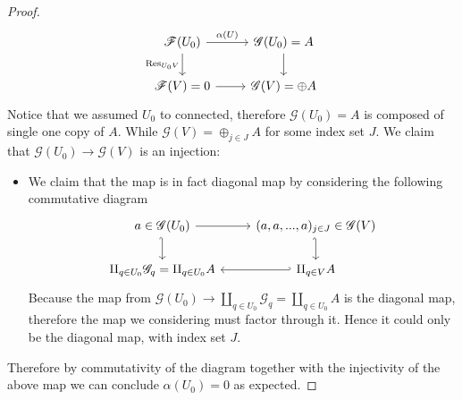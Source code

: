 \begin{proof}
\[\begin{tikzcd}
	{\mathscr F(U_0)} & {\mathscr G(U_0)=A} \\
	{\mathscr F(V)=0} & {\mathscr G(V)=\oplus A}
	\arrow["{\alpha(U)}", from=1-1, to=1-2]
	\arrow["{\operatorname{Res}_{U_0V}}"', from=1-1, to=2-1]
	\arrow[from=2-1, to=2-2]
	\arrow[from=1-2, to=2-2]
\end{tikzcd}\]
Notice that we assumed $U_0$ to connected, therefore $\mathscr G(U_0)=A$ is composed of single one copy of $A$. While $\mathscr G(V)=\oplus_{j\in J} A$ for some index set $J$.
We claim that $\mathscr G(U_0)\to \mathscr G(V)$ is an injection: 
\begin{itemize}
	\item We claim that the map is in fact diagonal map by considering the following commutative diagram 
\[\begin{tikzcd}
	{a\in \mathscr G(U_0)} & {(a,a,...,a)_{j\in J}\in\mathscr G(V)} \\
	{\amalg_{q\in U_0}\mathscr G_q=\amalg_{q\in U_0}A} & {\amalg_{q\in V}A}
	\arrow[hook', from=1-1, to=2-1]
	\arrow[hook', from=1-2, to=2-2]
	\arrow[from=1-1, to=1-2]
	\arrow[hook', from=2-2, to=2-1]
\end{tikzcd}\]
	Because the map from $\mathscr G(U_0)\to \amalg_{q\in U_0}\mathscr G_q=\amalg_{q\in U_0}A$ is the diagonal map, therefore the map we considering must factor through it. Hence it could only be the diagonal map, with index set $J$. 
\end{itemize} Therefore by commutativity of the diagram together with the injectivity of the above map we can conclude $\alpha(U_0)=0$ as expected.

\end{proof}



